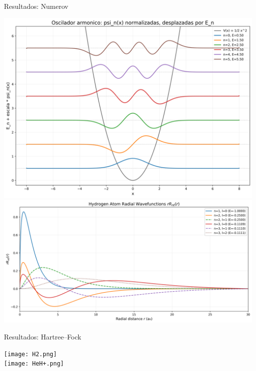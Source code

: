 \documentclass[final]{beamer}
\begin{document}
\begin{frame}[t]
\begin{columns}[t,totalwidth=\textwidth]
\begin{column}{0.32\textwidth}
  \begin{block}{Resultados: Numerov}
    \begin{center}
      \includegraphics[width=0.95\linewidth]{harmonic.png}\\
      \vspace{0.5cm}
      \includegraphics[width=0.95\linewidth]{hydrogen.png}
    \end{center}
  \end{block}

  \begin{block}{Resultados: Hartree–Fock}
    \begin{center}
      \texttt{[image: H2.png]}\\
      \vspace{0.5cm}
      \texttt{[image: HeH+.png]}
    \end{center}
  \end{block}
\end{column}


\end{columns}
\end{frame}
\end{document}
